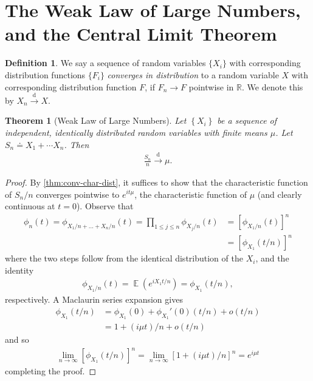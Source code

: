 \documentclass[12pt]{amsbook}
\newcommand{\rr}{\mathbb{R}}
\DeclareMathOperator{\ex}{\mathbb{E}}
\theoremstyle{plain}
\newtheorem{theorem}{Theorem}
\theoremstyle{definition}
\newtheorem*{definition}{Definition}
\theoremstyle{remark}
\numberwithin{equation}{section}  %
\numberwithin{equation}{section}  %
\begin{document}
	\section{The Weak Law of Large Numbers, and the Central Limit Theorem}
	\begin{definition}
		We say a sequence of random variables $\{X_{i}\}$
		with corresponding distribution functions $\{F_{i}\}$
		\emph{converges in distribution} to a random variable $X$ with corresponding
		distribution function $F$, if $F_{n} \to F$ pointwise in $\rr$.
		We denote this by $X_{n} \xrightarrow{\text{d}} X$.
	\end{definition}
	\begin{theorem}[Weak Law of Large Numbers]\label{thm:weak-law}
		Let $\left\{ X_{i} \right\}$ be a sequence of independent, identically
		distributed random variables with finite means $\mu$. Let
		$S_{n} \doteq X_{1} + \cdots X_{n}$. Then
		\begin{equation*}
			\begin{split}
				\frac{S_{n}}{n} \xrightarrow{\text{d}} \mu.
			\end{split}
		\end{equation*}
	\end{theorem}
	\begin{proof}
		By \cref{thm:conv-char-dist}, it suffices to show that
		the characteristic function of $S_{n}/n$ converges
		pointwise to  $e^{it \mu}$, the characteristic function of $\mu$ (and clearly
		continuous at $t=0$). Observe that
		\begin{equation*}
			\begin{split}
				\phi_{n}(t) = \phi_{X_{1}/n + \ldots + X_{n}/n}(t)
				= \prod_{1 \le j \le n} \phi_{X_{j}/n}(t)
				& = \left[ \phi_{X_{1}/n}(t) \right]^{n}
				\\
				& = \left[ \phi_{X_{1}}(t/n) \right]^{n}
			\end{split}
		\end{equation*}
		where the two steps follow from the identical distribution of the $X_{i}$,
		and the identity
		\begin{equation*}
			\begin{split}
				\phi_{X_{1}/n}(t) = \ex(e^{i X_{1} t /n}) = \phi_{X_{1}}(t/n),
			\end{split}
		\end{equation*}
		respectively. A Maclaurin series expansion gives
		\begin{equation*}
			\begin{split}
				\phi_{X_{1}}(t/n) & = \phi_{X_{1}}(0) + \phi_{X_{1}}'(0)(t/n) + o(t/n)
				\\
				& = 1 + (i \mu t)/n + o(t/n)
			\end{split}
		\end{equation*}
		and so
		\begin{equation*}
			\begin{split}
				\lim_{n \to \infty} \left[ \phi_{X_{1}}(t/n) \right]^{n}
				= \lim_{n \to \infty} \left[ 1 + (i \mu t)/n \right]^{n} = e^{i \mu t}
			\end{split}
		\end{equation*}
		completing the proof.
	\end{proof}
\end{document}
